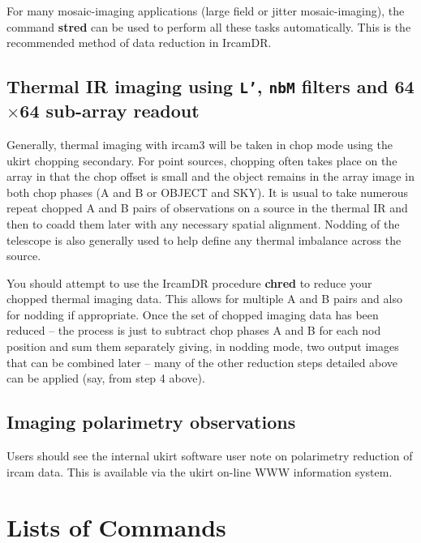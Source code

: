 For many mosaic-imaging applications (large field or jitter
mosaic-imaging), the command {\bf stred} can be used to perform all
these tasks automatically.  This is the recommended method of data
reduction in {\sc IrcamDR}.

\subsection{\label{ss:thermal_ir_imaging}Thermal
IR imaging using {\tt L'}, {\tt nbM} filters and 64$\times$64 sub-array readout}

Generally, thermal imaging with {\sc ircam3} will be taken in chop mode
using the {\sc ukirt} chopping secondary.  For point sources, chopping
often takes place on the array in that the chop offset is small and the
object remains in the array image in both chop phases (A and B or
OBJECT and SKY).  It is usual to take numerous repeat chopped A and B
pairs of observations on a source in the thermal IR and then to coadd
them later with any necessary spatial alignment.  Nodding of the
telescope is also generally used to help define any thermal imbalance
across the source.

You should attempt to use the {\sc IrcamDR} procedure {\bf chred} to
reduce your chopped thermal imaging data.  This allows for multiple A
and B pairs and also for nodding if appropriate.  Once the set of
chopped imaging data has been reduced -- the process is just to subtract
chop phases A and B for each nod position and sum them separately
giving, in nodding mode, two output images that can be combined later
-- many of the other reduction steps detailed above can be applied
(say, from step 4 above).

\subsection{\label{ss:imaging_polarimetry_observations}Imaging polarimetry observations}

Users should see the internal {\sc ukirt} software user note on
polarimetry reduction of {\sc ircam} data.  This is available via the {\sc
ukirt} on-line WWW information system.

\newpage


\section{\label{se:command_lists}Lists of Commands}

